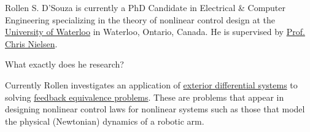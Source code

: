 Rollen S. D'Souza is currently a PhD Candidate in Electrical \& Computer Engineering specializing in the theory of nonlinear control design at the \href{https://uwaterloo.ca/}{University of Waterloo} in Waterloo, Ontario, Canada.
He is supervised by \href{https://ece.uwaterloo.ca/~cnielsen/}{Prof. Chris Nielsen}.

What exactly does he research?

Currently Rollen investigates an application of \href{https://en.wikipedia.org/wiki/Differential_ideal}{exterior differential systems} to solving \href{https://en.wikipedia.org/wiki/Feedback_linearization}{feedback equivalence problems}.
These are problems that appear in designing nonlinear control laws for nonlinear systems such as those that model the physical (Newtonian) dynamics of a robotic arm.
